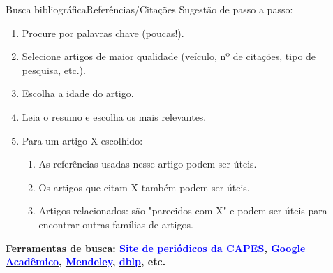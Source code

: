 \documentclass[t]{beamer}
\begin{document}

\begin{ftst}{Busca bibliográfica}{Referências/Citações}
\justifying
Sugestão de passo a passo:
\begin{enumerate}
    \item Procure por palavras chave (poucas!).

    \item Selecione artigos de maior qualidade (veículo, nº de citações, tipo de pesquisa, etc.).

    \item Escolha a idade do artigo.

    \item Leia o resumo e escolha os mais relevantes.
    \item Para um artigo X escolhido:
    \begin{enumerate}
        \item As referências usadas nesse artigo podem ser úteis.
        \item Os artigos que citam X também podem ser úteis.
        \item Artigos relacionados: são "parecidos com X" e podem ser úteis para encontrar outras famílias de artigos.
    \end{enumerate}
\end{enumerate}
\vone
\small
\textbf{Ferramentas de busca: \href{https://www-periodicos-capes-gov-br.ezl.periodicos.capes.gov.br/index.php?}{\textcolor{blue}{Site de periódicos da CAPES}}, \href{https://scholar.google.com.br/?hl=pt}{\textcolor{blue}{Google Acadêmico}}, \href{https://www.mendeley.com/}{\textcolor{blue}{Mendeley}}, \href{https://dblp.org/}{\textcolor{blue}{dblp}}, etc.}

\end{ftst}
\end{document}
